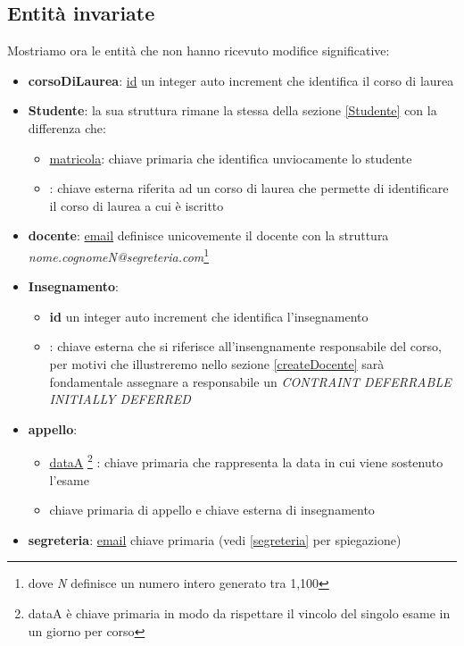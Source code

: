 \subsection{Entità invariate}
Mostriamo ora le entità che non hanno ricevuto modifice significative: 
\begin{itemize}
    \item \textbf{corsoDiLaurea}: \underline{id} un integer auto increment che identifica il corso di laurea 
    \item \textbf{Studente}: la sua struttura rimane la stessa della sezione \ref{Studente} con la differenza che:
    \begin{itemize}
        \item \underline{matricola}: chiave primaria che identifica unviocamente lo studente  
        \item {}: chiave esterna riferita ad un corso di laurea che permette di identificare il corso di laurea a cui è iscritto 
    \end{itemize}
    \item \textbf{docente}: \underline{email} definisce unicovemente il docente con la struttura \textit{nome.cognomeN@segreteria.com}\footnote{dove \textit{N} definisce un numero intero generato tra 1,100}
    \item \textbf{Insegnamento}: 
    \begin{itemize}
        \item \textbf{id}  un integer auto increment che identifica l'insegnamento
        \item  {}: chiave esterna che si riferisce all'insengnamente responsabile del corso, per motivi che illustreremo nello sezione \ref{createDocente} sarà fondamentale assegnare a responsabile un \textit{CONTRAINT DEFERRABLE INITIALLY DEFERRED}

    \end{itemize}
    \item \textbf{appello}:
    \begin{itemize}
        \item \underline{dataA}
        \footnote{dataA è chiave primaria in modo da rispettare il vincolo del singolo esame in un giorno per corso}
        : chiave primaria che rappresenta la data in cui viene sostenuto l'esame
        \item {} chiave primaria di appello e chiave esterna di insegnamento
    \end{itemize}
    \item \textbf{segreteria}: \underline{email} chiave primaria (vedi \ref{segreteria} per spiegazione)
\end{itemize}
